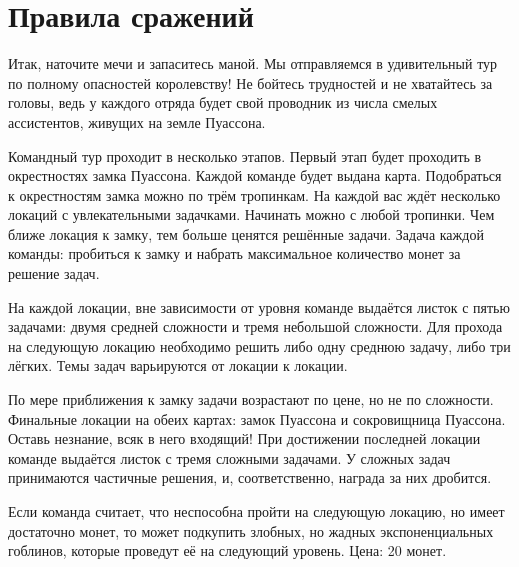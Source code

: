 \documentclass[a4paper,12pt]{article}
\begin{document}

\section*{Правила сражений}

Итак, наточите мечи и запаситесь маной. Мы отправляемся в удивительный тур по полному опасностей королевству! 
Не бойтесь трудностей и не хватайтесь за головы, 
ведь у каждого отряда будет свой проводник из числа смелых ассистентов, живущих на земле Пуассона.

Командный тур проходит в несколько этапов. Первый этап будет проходить в окрестностях замка Пуассона. 
Каждой команде будет выдана карта. Подобраться к окрестностям замка можно по трём тропинкам. 
На каждой вас ждёт несколько локаций с увлекательными задачками. Начинать можно с любой тропинки. 
Чем ближе локация к замку, тем больше ценятся решённые задачи. Задача каждой команды: 
пробиться к замку и набрать максимальное количество монет за решение задач. 

 На каждой локации, вне зависимости от уровня команде выдаётся листок с пятью задачами: 
 двумя средней сложности и тремя небольшой сложности. 
 Для прохода на следующую локацию необходимо решить либо одну среднюю задачу, либо три лёгких.  
 Темы задач варьируются от локации к локации.

По мере приближения к замку задачи возрастают по цене, но не по сложности. 
Финальные локации на обеих картах: замок Пуассона и сокровищница Пуассона. 
Оставь незнание, всяк в него входящий! 
При достижении последней локации команде выдаётся листок с тремя сложными задачами.  
У сложных задач принимаются частичные решения, и, соответственно, награда за них дробится. 


%
Если команда считает, что неспособна пройти на следующую локацию, но имеет достаточно монет, 
то может подкупить злобных, но жадных экспоненциальных гоблинов, 
которые проведут её на следующий уровень. Цена: 20 монет.
\end{document}
